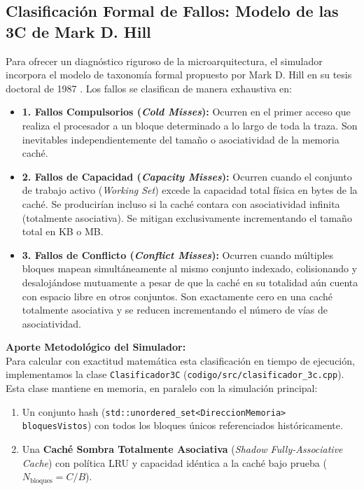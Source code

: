 \documentclass[11pt,letterpaper]{article}
\begin{document}
\subsection{Clasificación Formal de Fallos: Modelo de las 3C de Mark D. Hill}
Para ofrecer un diagnóstico riguroso de la microarquitectura, el simulador incorpora el modelo de taxonomía formal propuesto por Mark D. Hill en su tesis doctoral de 1987 \cite{hill1987aspects}. Los fallos se clasifican de manera exhaustiva en:
\begin{itemize}
    \item \textbf{1. Fallos Compulsorios (\textit{Cold Misses}):} Ocurren en el primer acceso que realiza el procesador a un bloque determinado a lo largo de toda la traza. Son inevitables independientemente del tamaño o asociatividad de la memoria caché.
    \item \textbf{2. Fallos de Capacidad (\textit{Capacity Misses}):} Ocurren cuando el conjunto de trabajo activo (\textit{Working Set}) excede la capacidad total física en bytes de la caché. Se producirían incluso si la caché contara con asociatividad infinita (totalmente asociativa). Se mitigan exclusivamente incrementando el tamaño total en KB o MB.
    \item \textbf{3. Fallos de Conflicto (\textit{Conflict Misses}):} Ocurren cuando múltiples bloques mapean simultáneamente al mismo conjunto indexado, colisionando y desalojándose mutuamente a pesar de que la caché en su totalidad aún cuenta con espacio libre en otros conjuntos. Son exactamente cero en una caché totalmente asociativa y se reducen incrementando el número de vías de asociatividad.
\end{itemize}

\noindent\textbf{Aporte Metodológico del Simulador:}\\
Para calcular con exactitud matemática esta clasificación en tiempo de ejecución, implementamos la clase \texttt{Clasificador3C} (\texttt{codigo/src/clasificador\_3c.cpp}). Esta clase mantiene en memoria, en paralelo con la simulación principal:
\begin{enumerate}
    \item Un conjunto hash (\texttt{std::unordered\_set<DireccionMemoria> bloquesVistos}) con todos los bloques únicos referenciados históricamente.
    \item Una \textbf{Caché Sombra Totalmente Asociativa} (\textit{Shadow Fully-Associative Cache}) con política LRU y capacidad idéntica a la caché bajo prueba ($N_{\text{bloques}} = C / B$).
\end{enumerate}
\end{document}
